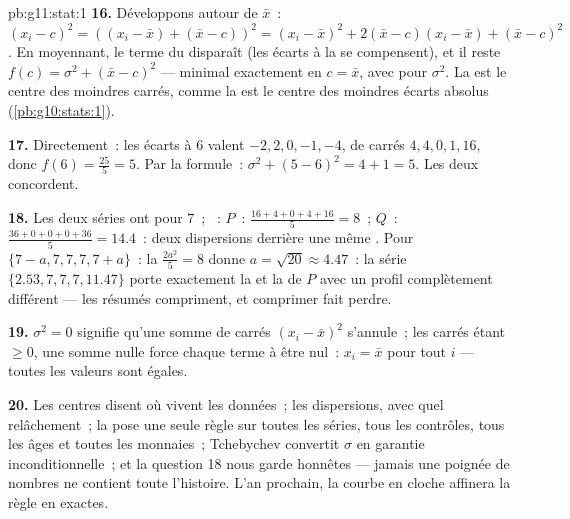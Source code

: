 \begin{solution}{pb:g11:stat:1}
\textbf{16.} Développons autour de $\bar x$~:
$(x_i - c)^2 = \left((x_i - \bar x) + (\bar x - c)\right)^2
= (x_i - \bar x)^2 + 2(\bar x - c)(x_i - \bar x) +
(\bar x - c)^2$. En moyennant, le terme du  disparaît (les
écarts à la  se compensent), et il reste
$f(c) = \sigma^2 + (\bar x - c)^2$ --- minimal exactement en
$c = \bar x$, avec pour  $\sigma^2$. La  est le centre
des moindres carrés, comme la  est le centre des moindres
écarts absolus (\cref{pb:g10:stats:1}).

\textbf{17.} Directement~: les écarts à $6$ valent
$-2, 2, 0, -1, -4$, de carrés $4, 4, 0, 1, 16$, donc
$f(6) = \frac{25}{5} = 5$. Par la formule~:
$\sigma^2 + (5 - 6)^2 = 4 + 1 = 5$. Les deux concordent.

\textbf{18.} Les deux séries ont pour  $7$~; ~:
$P$~: $\frac{16 + 4 + 0 + 4 + 16}{5} = 8$~;
$Q$~: $\frac{36 + 0 + 0 + 0 + 36}{5} = 14.4$~: deux dispersions
derrière une même . Pour $\{7 - a, 7, 7, 7, 7 + a\}$~: la
 $\frac{2a^2}{5} = 8$ donne $a = \sqrt{20} \approx 4.47$~:
la série $\{2.53, 7, 7, 7, 11.47\}$ porte exactement la  et
la  de $P$ avec un profil complètement différent --- les
résumés compriment, et comprimer fait perdre.

\textbf{19.} $\sigma^2 = 0$ signifie qu'une somme de carrés
$(x_i - \bar x)^2$ s'annule~; les carrés étant $\geq 0$, une somme
nulle force chaque terme à être nul~: $x_i = \bar x$ pour tout $i$
--- toutes les valeurs sont égales.

\textbf{20.} Les centres disent où vivent les données~; les
dispersions, avec quel relâchement~; la  pose une seule
règle sur toutes les séries, tous les contrôles, tous les âges et
toutes les monnaies~; Tchebychev convertit $\sigma$ en garantie
inconditionnelle~; et la question 18 nous garde honnêtes --- jamais
une poignée de nombres ne contient toute l'histoire. L'an prochain,
la courbe en cloche affinera la règle en  exactes.
\end{solution}
